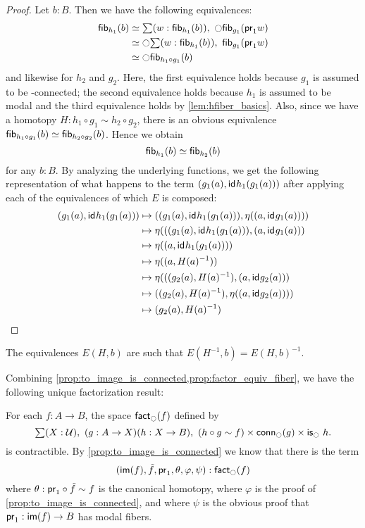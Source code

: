 \begin{proof}
Let $b:B$. Then we have the following equivalences:
\begin{align*}
\hfib{h_1}b & \simeq \sm{w:\hfib{h_1}b} \modal \hfib{g_1}{\proj1 w}\\
& \simeq \modal\sm{w:\hfib{h_1}b}\hfib{g_1}{\proj1 w}\\
& \simeq \modal\hfib{h_1\circ g_1}b
\end{align*}
and likewise for $h_2$ and $g_2$. Here, the first equivalence holds because $g_1$ is assumed to be \modal-connected; the second equivalence
holds because $h_1$ is assumed to be modal and the third equivalence holds by \autoref{lem:hfiber_basics}. Also, since we have a
homotopy $H:h_1\circ g_1\sim h_2\circ g_2$, there is an obvious equivalence ${\mathsf{fib}}_{h_1\circ g_1}(b)\simeq{\mathsf{fib}}_{h_2\circ g_2}(b)$. Hence we
obtain
\begin{equation*}
{\mathsf{fib}}_{h_1}(b)\simeq{\mathsf{fib}}_{h_2}(b)
\end{equation*}
for any $b:B$. By analyzing the underlying functions, we get the following representation of what happens to the term
${(g_1(a),\mathsf{id}_{}{h_1(g_1(a))})}$ after applying each of the equivalences of which $E$ is composed:
\begin{align*}
\pairr{g_1(a),\idfunc{h_1(g_1(a))}} & 
    \mapsto \pairr{\pairr{g_1(a),\idfunc{h_1(g_1(a))}}, \eta( \pairr{a,\idfunc{g_1(a)}} )}\\
  & \mapsto \eta( \pairr{\pairr{g_1(a),\idfunc{h_1(g_1(a))}}, \pairr{a,\idfunc{g_1(a)}} }\\
  & \mapsto \eta( \pairr{a,\idfunc{h_1(g_1(a))}})\\
  & \mapsto \eta( \pairr{a,H(a)^{-1}})\\
  & \mapsto \eta( \pairr{\pairr{g_2(a),H(a)^{-1}},\pairr{a,\idfunc{g_2(a)}}}\\
  & \mapsto \pairr{\pairr{g_2(a),H(a)^{-1}}, \eta(\pairr{a,\idfunc{g_2(a)}}) }\\
  & \mapsto \pairr{g_2(a),H(a)^{-1}}\qedhere
\end{align*}
\end{proof}

The equivalences $E(H,b)$ are such that $E(H^{-1},b)= E(H,b)^{-1}$.

Combining \autoref{prop:to_image_is_connected,prop:factor_equiv_fiber}, we have the following unique factorization result:

\begin{thm}
For each $f:A\to B$, the space $\textsf{fact}_{\ocircle}(f)$ defined by
\begin{equation*}
\sm{X:\type}(g:A\to X)(h:X\to B),\ (h\circ g\sim f)\times\mathsf{conn}_\modal(g)\times\ismodal\ h.
\end{equation*}
is contractible. By \autoref{prop:to_image_is_connected} we know that there is the term
\begin{equation*}
{(\ensuremath{\mathsf{im}}(f),\tilde{f},\ensuremath{\mathsf{pr}_{1}},\theta,\varphi,\psi)}:\textsf{fact}_{\ocircle}(f)
\end{equation*}
where $\theta:\mathsf{pr}_{1}\circ\tilde{f}\sim f$ is the canonical homotopy, where $\varphi$ is the proof of
\autoref{prop:to_image_is_connected}, and where $\psi$ is the obvious proof that $\mathsf{pr}_{1}:\mathsf{im}(f)\to B$ has modal fibers.
\end{thm}

